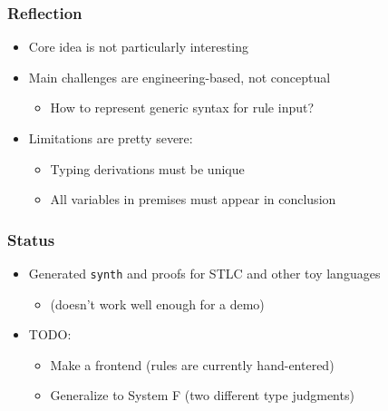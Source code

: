 \documentclass[usenames,dvipsnames]{beamer}
\newcommand{\synth}{\texttt{synth}}
\begin{document}

\begin{frame}
  \frametitle{Reflection}

  \begin{itemize}
    \item Core idea is not particularly interesting
    \item Main challenges are engineering-based, not conceptual
      \begin{itemize}
        \item How to represent generic syntax for rule input?
      \end{itemize}
    \item Limitations are pretty severe:
      \begin{itemize}
        \item Typing derivations must be unique
        \item All variables in premises must appear in conclusion
      \end{itemize}
  \end{itemize}
\end{frame}


\begin{frame}
  \frametitle{Status}

  \begin{itemize}
    \item Generated \synth{} and proofs for STLC and other toy languages
      \begin{itemize}
        \item (doesn't work well enough for a demo)
      \end{itemize}

    \item TODO:
      \begin{itemize}
        \item Make a frontend (rules are currently hand-entered)
        \item Generalize to System F (two different type judgments)
      \end{itemize}
  \end{itemize}
\end{frame}
\end{document}
